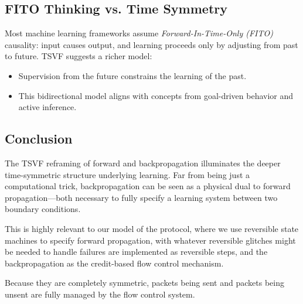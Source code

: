 \documentclass[../../../OAE-SPEC-MAIN.tex]{subfiles}
\begin{document}
\subsection{FITO Thinking vs. Time Symmetry}

Most machine learning frameworks assume \emph{Forward-In-Time-Only (FITO)} causality: input causes output, and learning proceeds only by adjusting from past to future. TSVF suggests a richer model:

\begin{itemize}
  \item Supervision from the future constrains the learning of the past.
  \item This bidirectional model aligns with concepts from goal-driven behavior and active inference.
\end{itemize}

\subsection{Conclusion}

The TSVF reframing of forward and backpropagation illuminates the deeper time-symmetric structure underlying learning. Far from being just a computational trick, backpropagation can be seen as a physical dual to forward propagation—both necessary to fully specify a learning system between two boundary conditions.

 
This is highly relevant to our model of the protocol, where we use reversible state machines to specify forward propagation, with whatever reversible glitches might be needed to handle failures are implemented as reversible steps, and the backpropagation  as the credit-based flow control mechanism.

Because they are completely symmetric, packets being sent and packets being unsent are fully managed by the flow control system.
\end{document}
